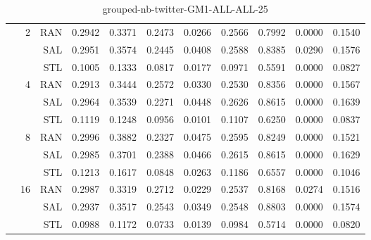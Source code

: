 \begin{center}
\begin{table}[htbp]
\begin{center}
\begin{tabular}{ | r | r | r | r | r | r | r | r | r | r | r |}
 & \multirow{3}{*}{2} & RAN & 0.2942 & 0.3371 & 0.2473 & 0.0266 & 0.2566 & 0.7992 & 0.0000 & 0.1540\\ \cline{3-11}
 &   & SAL & 0.2951 & 0.3574 & 0.2445 & 0.0408 & 0.2588 & 0.8385 & 0.0290 & 0.1576\\ \cline{3-11}
 &   & STL & 0.1005 & 0.1333 & 0.0817 & 0.0177 & 0.0971 & 0.5591 & 0.0000 & 0.0827\\ \cline{2-11}
 & \multirow{3}{*}{4} & RAN & 0.2913 & 0.3444 & 0.2572 & 0.0330 & 0.2530 & 0.8356 & 0.0000 & 0.1567\\ \cline{3-11}
 &   & SAL & 0.2964 & 0.3539 & 0.2271 & 0.0448 & 0.2626 & 0.8615 & 0.0000 & 0.1639\\ \cline{3-11}
 &   & STL & 0.1119 & 0.1248 & 0.0956 & 0.0101 & 0.1107 & 0.6250 & 0.0000 & 0.0837\\ \cline{2-11}
 & \multirow{3}{*}{8} & RAN & 0.2996 & 0.3882 & 0.2327 & 0.0475 & 0.2595 & 0.8249 & 0.0000 & 0.1521\\ \cline{3-11}
 &   & SAL & 0.2985 & 0.3701 & 0.2388 & 0.0466 & 0.2615 & 0.8615 & 0.0000 & 0.1629\\ \cline{3-11}
 &   & STL & 0.1213 & 0.1617 & 0.0848 & 0.0263 & 0.1186 & 0.6557 & 0.0000 & 0.1046\\ \cline{2-11}
 & \multirow{3}{*}{16} & RAN & 0.2987 & 0.3319 & 0.2712 & 0.0229 & 0.2537 & 0.8168 & 0.0274 & 0.1516\\ \cline{3-11}
 &   & SAL & 0.2937 & 0.3517 & 0.2543 & 0.0349 & 0.2548 & 0.8803 & 0.0000 & 0.1574\\ \cline{3-11}
 &   & STL & 0.0988 & 0.1172 & 0.0733 & 0.0139 & 0.0984 & 0.5714 & 0.0000 & 0.0820\\ \cline{2-11}
\hline
\end{tabular}
\caption{grouped-nb-twitter-GM1-ALL-ALL-25}
\end{center}
 \end{table}
\end{center}

